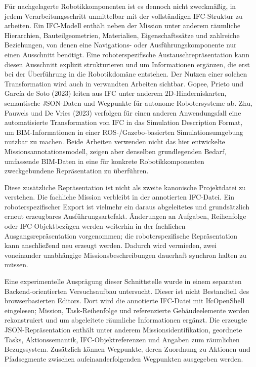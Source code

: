 Für nachgelagerte Robotikkomponenten ist es dennoch nicht zweckmäßig, in jedem Verarbeitungsschritt
unmittelbar mit der vollständigen IFC-Struktur zu arbeiten. Ein IFC-Modell enthält neben der Mission
unter anderem räumliche Hierarchien, Bauteilgeometrien, Materialien, Eigenschaftssätze und
zahlreiche Beziehungen, von denen eine Navigations- oder Ausführungskomponente nur einen Ausschnitt
benötigt. Eine roboterspezifische Austauschrepräsentation kann diesen Ausschnitt explizit
strukturieren und um Informationen ergänzen, die erst bei der Überführung in die Robotikdomäne
entstehen. Der Nutzen einer solchen Transformation wird auch in verwandten Arbeiten sichtbar. Gopee,
Prieto und García de Soto (2023) leiten aus IFC unter anderem 2D-Hinderniskarten, semantische
JSON-Daten und Wegpunkte für autonome Robotersysteme ab. Zhu, Pauwels und De Vries (2023) verfolgen
für einen anderen Anwendungsfall eine automatisierte Transformation von IFC in das Simulation
Description Format, um BIM-Informationen in einer ROS-/Gazebo-basierten Simulationsumgebung nutzbar
zu machen. Beide Arbeiten verwenden nicht das hier entwickelte Missionsannotationsmodell, zeigen
aber denselben grundlegenden Bedarf, umfassende BIM-Daten in eine für konkrete Robotikkomponenten
zweckgebundene Repräsentation zu überführen.

Diese zusätzliche Repräsentation ist nicht als zweite kanonische Projektdatei zu verstehen. Die
fachliche Mission verbleibt in der annotierten IFC-Datei. Ein roboterspezifischer Export ist
vielmehr ein daraus abgeleitetes und grundsätzlich erneut erzeugbares Ausführungsartefakt.
Änderungen an Aufgaben, Reihenfolge oder IFC-Objektbezügen werden weiterhin in der fachlichen
Ausgangsrepräsentation vorgenommen; die roboterspezifische Repräsentation kann anschließend neu
erzeugt werden. Dadurch wird vermieden, zwei voneinander unabhängige Missionsbeschreibungen
dauerhaft synchron halten zu müssen.

Eine experimentelle Ausprägung dieser Schnittstelle wurde in einem separaten Backend-orientierten
Versuchsaufbau untersucht. Dieser ist nicht Bestandteil des browserbasierten Editors. Dort wird die
annotierte IFC-Datei mit IfcOpenShell eingelesen; Mission, Task-Reihenfolge und referenzierte
Gebäudeelemente werden rekonstruiert und um abgeleitete räumliche Informationen ergänzt. Die
erzeugte JSON-Repräsentation enthält unter anderem Missionsidentifikation, geordnete Tasks,
Aktionssemantik, IFC-Objektreferenzen und Angaben zum räumlichen Bezugssystem. Zusätzlich können
Wegpunkte, deren Zuordnung zu Aktionen und Pfadsegmente zwischen aufeinanderfolgenden Wegpunkten
ausgegeben werden.

